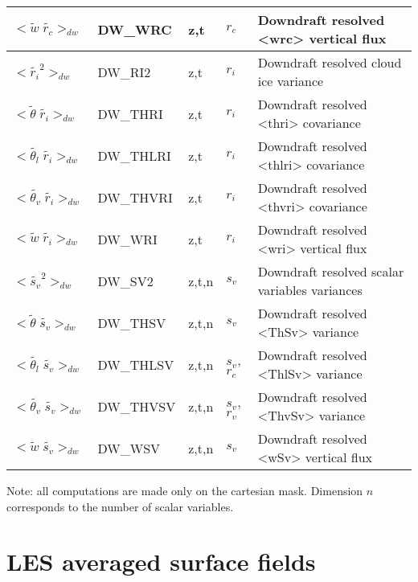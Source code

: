 \begin{longtable}[c]{|p{}|p{}|p{}|p{}|p{}|}
$<{\tilde{w}\;\tilde{r_c}}>_{dw}$             & DW\_WRC   & z,t   & $r_c$ & Downdraft resolved <wrc> vertical flux \\\hline
$<{\tilde{r_i}}^2>_{dw}$                      & DW\_RI2   & z,t   & $r_i$ & Downdraft resolved cloud ice variance \\\hline
$<{\tilde{\theta}\;\tilde{r_i}}>_{dw}$        & DW\_THRI  & z,t   & $r_i$ & Downdraft resolved <thri> covariance \\\hline
$<{\tilde{\theta_l}\;\tilde{r_i}}>_{dw}$      & DW\_THLRI & z,t   & $r_i$ & Downdraft resolved <thlri> covariance \\\hline
$<{\tilde{\theta_v}\;\tilde{r_i}}>_{dw}$      & DW\_THVRI & z,t   & $r_i$ & Downdraft resolved <thvri> covariance \\\hline
$<{\tilde{w}\;\tilde{r_i}}>_{dw}$             & DW\_WRI   & z,t   & $r_i$ & Downdraft resolved <wri> vertical flux \\\hline
$<{\tilde{s_v}}^2>_{dw}$                      & DW\_SV2   & z,t,n & $s_v$ & Downdraft resolved scalar variables variances \\\hline
$<{\tilde{\theta}\;\tilde{s_v}}>_{dw}$        & DW\_THSV  & z,t,n & $s_v$ & Downdraft resolved <ThSv> variance \\\hline
$<{\tilde{\theta_l}\;\tilde{s_v}}>_{dw}$      & DW\_THLSV & z,t,n & $s_v$, $r_c$ & Downdraft resolved <ThlSv> variance \\\hline
$<{\tilde{\theta_v}\;\tilde{s_v}}>_{dw}$      & DW\_THVSV & z,t,n & $s_v$, $r_v$ & Downdraft resolved <ThvSv> variance \\\hline
$<{\tilde{w}\;\tilde{s_v}}>_{dw}$             & DW\_WSV   & z,t,n & $s_v$ & Downdraft resolved <wSv> vertical flux \\\hline
\end{longtable}

Note: all computations are made only on the cartesian mask. Dimension $n$ corresponds to the number of scalar variables.


\section{LES averaged surface fields}

